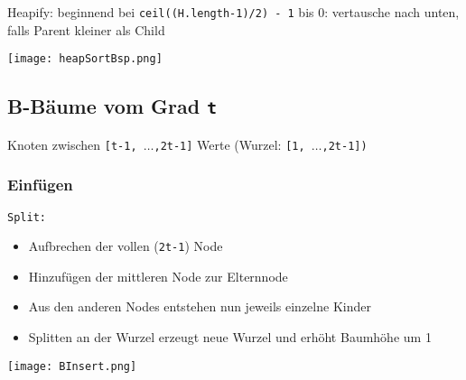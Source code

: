             \noindent
            Heapify: beginnend bei \texttt{ceil((H.length-1)/2) - 1} bis 0: vertausche nach unten, falls Parent kleiner als Child
            \centerline{\texttt{[image: heapSortBsp.png]}}

    \subsection{B-Bäume vom Grad \texttt{t}}
        \centerline{Knoten zwischen \texttt{[t-1, $\dots$,2t-1]} Werte (Wurzel: \texttt{[1, $\dots$,2t-1])}} 
        \subsubsection{Einfügen}
            \texttt{Split:}
                \begin{itemize}
                    \item Aufbrechen der vollen (\texttt{2t-1}) Node
                    \item Hinzufügen der mittleren Node zur Elternnode
                    \item Aus den anderen Nodes entstehen nun jeweils einzelne Kinder
                    \item Splitten an der Wurzel erzeugt neue Wurzel und erhöht Baumhöhe um 1
                \end{itemize}

            \centerline{\texttt{[image: BInsert.png]}}

